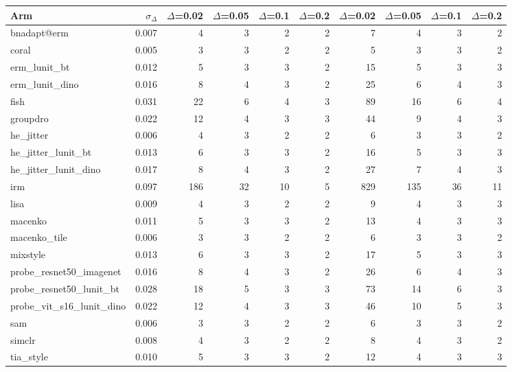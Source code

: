 \begin{tabular}{lrrrrrrrrr}
\toprule
Arm & $\sigma_\Delta$ & $\Delta$=0.02 & $\Delta$=0.05 & $\Delta$=0.1 & $\Delta$=0.2 & $\Delta$=0.02 & $\Delta$=0.05 & $\Delta$=0.1 & $\Delta$=0.2 \\
\midrule
bnadapt@erm & 0.007 & 4 & 3 & 2 & 2 & 7 & 4 & 3 & 2 \\
coral & 0.005 & 3 & 3 & 2 & 2 & 5 & 3 & 3 & 2 \\
erm\_lunit\_bt & 0.012 & 5 & 3 & 3 & 2 & 15 & 5 & 3 & 3 \\
erm\_lunit\_dino & 0.016 & 8 & 4 & 3 & 2 & 25 & 6 & 4 & 3 \\
fish & 0.031 & 22 & 6 & 4 & 3 & 89 & 16 & 6 & 4 \\
groupdro & 0.022 & 12 & 4 & 3 & 3 & 44 & 9 & 4 & 3 \\
he\_jitter & 0.006 & 4 & 3 & 2 & 2 & 6 & 3 & 3 & 2 \\
he\_jitter\_lunit\_bt & 0.013 & 6 & 3 & 3 & 2 & 16 & 5 & 3 & 3 \\
he\_jitter\_lunit\_dino & 0.017 & 8 & 4 & 3 & 2 & 27 & 7 & 4 & 3 \\
irm & 0.097 & 186 & 32 & 10 & 5 & 829 & 135 & 36 & 11 \\
lisa & 0.009 & 4 & 3 & 2 & 2 & 9 & 4 & 3 & 3 \\
macenko & 0.011 & 5 & 3 & 3 & 2 & 13 & 4 & 3 & 3 \\
macenko\_tile & 0.006 & 3 & 3 & 2 & 2 & 6 & 3 & 3 & 2 \\
mixstyle & 0.013 & 6 & 3 & 3 & 2 & 17 & 5 & 3 & 3 \\
probe\_resnet50\_imagenet & 0.016 & 8 & 4 & 3 & 2 & 26 & 6 & 4 & 3 \\
probe\_resnet50\_lunit\_bt & 0.028 & 18 & 5 & 3 & 3 & 73 & 14 & 6 & 3 \\
probe\_vit\_s16\_lunit\_dino & 0.022 & 12 & 4 & 3 & 3 & 46 & 10 & 5 & 3 \\
sam & 0.006 & 3 & 3 & 2 & 2 & 6 & 3 & 3 & 2 \\
simclr & 0.008 & 4 & 3 & 2 & 2 & 8 & 4 & 3 & 2 \\
tia\_style & 0.010 & 5 & 3 & 3 & 2 & 12 & 4 & 3 & 3 \\
\bottomrule
\end{tabular}

